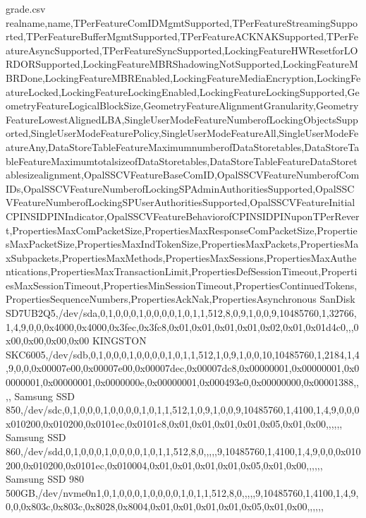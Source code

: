 \documentclass[
  digital, %
  oneside, %
  nolof,     %
  nolot,     %
]{fithesis4}
\begin{document}
\begin{filecontents*}{grade.csv}
realname,name,TPerFeatureComIDMgmtSupported,TPerFeatureStreamingSupported,TPerFeatureBufferMgmtSupported,TPerFeatureACKNAKSupported,TPerFeatureAsyncSupported,TPerFeatureSyncSupported,LockingFeatureHWResetforLORDORSupported,LockingFeatureMBRShadowingNotSupported,LockingFeatureMBRDone,LockingFeatureMBREnabled,LockingFeatureMediaEncryption,LockingFeatureLocked,LockingFeatureLockingEnabled,LockingFeatureLockingSupported,GeometryFeatureLogicalBlockSize,GeometryFeatureAlignmentGranularity,GeometryFeatureLowestAlignedLBA,SingleUserModeFeatureNumberofLockingObjectsSupported,SingleUserModeFeaturePolicy,SingleUserModeFeatureAll,SingleUserModeFeatureAny,DataStoreTableFeatureMaximumnumberofDataStoretables,DataStoreTableFeatureMaximumtotalsizeofDataStoretables,DataStoreTableFeatureDataStoretablesizealignment,OpalSSCVFeatureBaseComID,OpalSSCVFeatureNumberofComIDs,OpalSSCVFeatureNumberofLockingSPAdminAuthoritiesSupported,OpalSSCVFeatureNumberofLockingSPUserAuthoritiesSupported,OpalSSCVFeatureInitialCPINSIDPINIndicator,OpalSSCVFeatureBehaviorofCPINSIDPINuponTPerRevert,PropertiesMaxComPacketSize,PropertiesMaxResponseComPacketSize,PropertiesMaxPacketSize,PropertiesMaxIndTokenSize,PropertiesMaxPackets,PropertiesMaxSubpackets,PropertiesMaxMethods,PropertiesMaxSessions,PropertiesMaxAuthentications,PropertiesMaxTransactionLimit,PropertiesDefSessionTimeout,PropertiesMaxSessionTimeout,PropertiesMinSessionTimeout,PropertiesContinuedTokens,PropertiesSequenceNumbers,PropertiesAckNak,PropertiesAsynchronous
SanDisk SD7UB2Q5,/dev/sda,0,1,0,0,0,1,0,0,0,0,1,0,1,1,512,8,0,9,1,0,0,9,10485760,1,32766,1,4,9,0,0,0x4000,0x4000,0x3fec,0x3fc8,0x01,0x01,0x01,0x01,0x02,0x01,0x01d4c0,,,0x00,0x00,0x00,0x00
KINGSTON SKC6005,/dev/sdb,0,1,0,0,0,1,0,0,0,0,1,0,1,1,512,1,0,9,1,0,0,10,10485760,1,2184,1,4,9,0,0,0x00007e00,0x00007e00,0x00007dec,0x00007dc8,0x00000001,0x00000001,0x00000001,0x00000001,0x0000000e,0x00000001,0x000493e0,0x00000000,0x00001388,,,,
Samsung SSD 850,/dev/sdc,0,1,0,0,0,1,0,0,0,0,1,0,1,1,512,1,0,9,1,0,0,9,10485760,1,4100,1,4,9,0,0,0x010200,0x010200,0x0101ec,0x0101c8,0x01,0x01,0x01,0x01,0x05,0x01,0x00,,,,,,
Samsung SSD 860,/dev/sdd,0,1,0,0,0,1,0,0,0,0,1,0,1,1,512,8,0,,,,,9,10485760,1,4100,1,4,9,0,0,0x010200,0x010200,0x0101ec,0x010004,0x01,0x01,0x01,0x01,0x05,0x01,0x00,,,,,,
Samsung SSD 980 500GB,/dev/nvme0n1,0,1,0,0,0,1,0,0,0,0,1,0,1,1,512,8,0,,,,,9,10485760,1,4100,1,4,9,0,0,0x803c,0x803c,0x8028,0x8004,0x01,0x01,0x01,0x01,0x05,0x01,0x00,,,,,,
\end{filecontents*}
\end{document}
